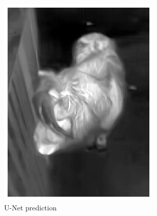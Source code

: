 \documentclass{l4proj}
\begin{document}
\begin{figure}[ht]
\begin{subfigure}[h!]{0.22\textwidth}
    \includegraphics[width=\textwidth]{images/autoencoder/train/unet.png}
    \caption{U-Net prediction}
    \label{fig:autoencoder_pony_train_unet}
  \end{subfigure}
  \begin{subfigure}[h!]{0.22\textwidth}

\end{subfigure}
\end{figure}
\end{document}
